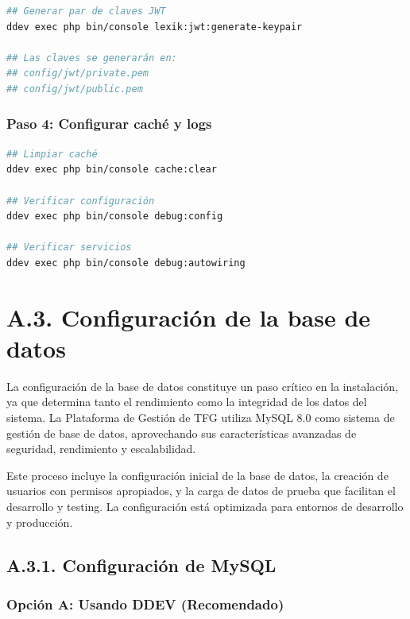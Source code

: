 \documentclass[12pt,a4paper,oneside]{report}
\begin{document}
\begin{lstlisting}[language=bash]
## Generar par de claves JWT
ddev exec php bin/console lexik:jwt:generate-keypair

## Las claves se generarán en:
## config/jwt/private.pem
## config/jwt/public.pem
\end{lstlisting}

\subsubsection{Paso 4: Configurar caché y
logs}\label{paso-4-configurar-cachuxe9-y-logs}

\begin{lstlisting}[language=bash]
## Limpiar caché
ddev exec php bin/console cache:clear

## Verificar configuración
ddev exec php bin/console debug:config

## Verificar servicios
ddev exec php bin/console debug:autowiring
\end{lstlisting}

\section{A.3. Configuración de la base de
datos}\label{a.3.-configuraciuxf3n-de-la-base-de-datos}

La configuración de la base de datos constituye un paso crítico en la instalación, ya que determina tanto el rendimiento como la integridad de los datos del sistema. La Plataforma de Gestión de TFG utiliza MySQL 8.0 como sistema de gestión de base de datos, aprovechando sus características avanzadas de seguridad, rendimiento y escalabilidad.

Este proceso incluye la configuración inicial de la base de datos, la creación de usuarios con permisos apropiados, y la carga de datos de prueba que facilitan el desarrollo y testing. La configuración está optimizada para entornos de desarrollo y producción.

\subsection{A.3.1. Configuración de
MySQL}\label{a.3.1.-configuraciuxf3n-de-mysql}

\subsubsection{Opción A: Usando DDEV
(Recomendado)}\label{opciuxf3n-a-usando-ddev-recomendado}
\end{document}
